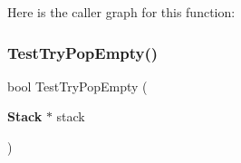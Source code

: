 Here is the caller graph for this function\+:
\mbox{\label{tests_8h_a2a1c0b9e5ed521fc87c522375bc335d1}} 
\subsubsection{Test\+Try\+Pop\+Empty()}
{\footnotesize\ttfamily bool Test\+Try\+Pop\+Empty (\begin{DoxyParamCaption}\item[{\textbf{ Stack} $\ast$}]{stack }\end{DoxyParamCaption})}

